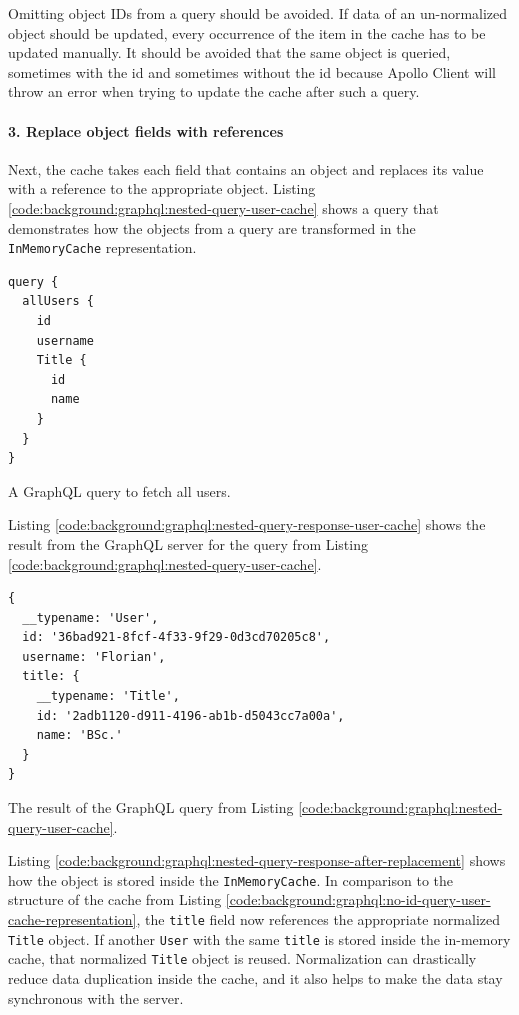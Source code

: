 \noindent Omitting object \acp{ID} from a query should be avoided. If data of an un-normalized object should be updated, every occurrence of the item in the cache has to be updated manually. It should be avoided that the same object is queried, sometimes with the id and sometimes without the id because Apollo Client will throw an error when trying to update the cache after such a query.

\paragraph{3. Replace object fields with references}\label{paragraph:background:graphql:apollo-server-client:data-normalization:replace-object-fields-with-references}

Next, the cache takes each field that contains an object and replaces its value with a reference to the appropriate object. Listing \ref{code:background:graphql:nested-query-user-cache} shows a query that demonstrates how the objects from a query are transformed in the \texttt{InMemoryCache} representation.

\ifshowListings
\begin{listing}[H]
  \begin{verbatim}
query {
  allUsers {
    id
    username
    Title {
      id
      name
    }
  }
}
  \end{verbatim}
  \caption{A GraphQL query to fetch all users.}\label{code:background:graphql:nested-query-user-cache}
\end{listing}
\fi

Listing \ref{code:background:graphql:nested-query-response-user-cache} shows the result from the GraphQL server for the query from Listing \ref{code:background:graphql:nested-query-user-cache}.

\ifshowListings
\begin{listing}[H]
    \begin{verbatim}
{
  __typename: 'User',
  id: '36bad921-8fcf-4f33-9f29-0d3cd70205c8',
  username: 'Florian',
  title: {
    __typename: 'Title',
    id: '2adb1120-d911-4196-ab1b-d5043cc7a00a',
    name: 'BSc.'
  }
}
    \end{verbatim}
    \caption{The result of the GraphQL query from Listing \ref{code:background:graphql:nested-query-user-cache}.} \label{code:background:graphql:nested-query-response-user-cache}
\end{listing}
\fi

\noindent Listing \ref{code:background:graphql:nested-query-response-after-replacement} shows how the object is stored inside the \texttt{InMemoryCache}. In comparison to the structure of the cache from Listing \ref{code:background:graphql:no-id-query-user-cache-representation}, the \texttt{title} field now references the appropriate normalized \texttt{Title} object. If another \texttt{User} with the same \texttt{title} is stored inside the in-memory cache, that normalized \texttt{Title} object is reused. Normalization can drastically reduce data duplication inside the cache, and it also helps to make the data stay synchronous with the server.

